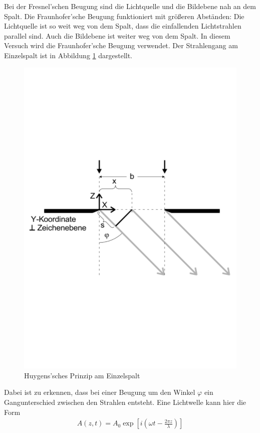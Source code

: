 Bei der Fresnel'schen Beugung sind die Lichtquelle und die Bildebene nah an dem Spalt.
Die Fraunhofer'sche Beugung funktioniert mit größeren Abständen:
Die Lichtquelle ist so weit weg von dem Spalt, dass die einfallenden Lichtstrahlen parallel sind.
Auch die Bildebene ist weiter weg von dem Spalt.
In diesem Versuch wird die Fraunhofer'sche Beugung verwendet.
Der Strahlengang am Einzelspalt ist in Abbildung \ref{fig:einzelspalt} dargestellt.
\begin{figure}[h!]
  \centering
  \includegraphics[width=\textwidth]{einzelspalt.pdf}
  \caption{Huygens'sches Prinzip am Einzelspalt \cite{1}}
  \label{fig:einzelspalt}
\end{figure}
Dabei ist zu erkennen, dass bei einer Beugung um den Winkel $\varphi$ ein Gangunterschied zwischen den Strahlen entsteht.
Eine Lichtwelle kann hier die Form
\begin{align*}
  A(z, t) = A_{0} \exp{ \left[i \left( \omega t - \frac{2 \pi z}{\lambda} \right) \right]}
\end{align*}
